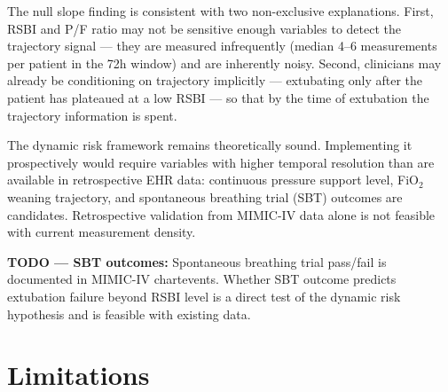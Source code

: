 \documentclass[11pt]{article}
\begin{document}
The null slope finding is consistent with two non-exclusive explanations.
First, RSBI and P/F ratio may not be sensitive enough variables to detect
the trajectory signal --- they are measured infrequently (median 4--6
measurements per patient in the 72h window) and are inherently noisy.
Second, clinicians may already be conditioning on trajectory implicitly ---
extubating only after the patient has plateaued at a low RSBI --- so that
by the time of extubation the trajectory information is spent.

The dynamic risk framework remains theoretically sound. Implementing it
prospectively would require variables with higher temporal resolution than
are available in retrospective EHR data: continuous pressure support level,
FiO$_2$ weaning trajectory, and spontaneous breathing trial (SBT) outcomes
are candidates. Retrospective validation from MIMIC-IV data alone is not
feasible with current measurement density.

\begin{todo}
\textbf{TODO --- SBT outcomes:} Spontaneous breathing trial pass/fail
is documented in MIMIC-IV chartevents. Whether SBT outcome predicts
extubation failure beyond RSBI level is a direct test of the dynamic
risk hypothesis and is feasible with existing data.
\end{todo}

\section{Limitations}
\end{document}
